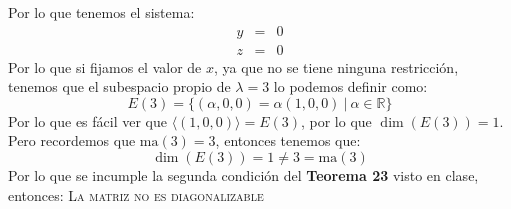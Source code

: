 \begin{itemize}
    Por lo que tenemos el sistema:
    \begin{eqnarray*}
    y&=&0\\
    z&=&0
    \end{eqnarray*}
    Por lo que si fijamos el valor de $x$, ya que no se tiene ninguna restricci\'on, tenemos que el subespacio propio de $\lambda=3$ lo podemos definir como:
    \[E(3)=\{(\alpha,0,0)=\alpha(1,0,0)~|~\alpha\in\mathbb{R}\}\]
    Por lo que es f\'acil ver que $\langle (1,0,0) \rangle=E(3)$, por lo que $\dim(E(3))=1$.\\
    Pero recordemos que $\text{ma}(3)=3$, entonces tenemos que:
    \[\dim(E(3))=1\neq3=\text{ma}(3) \]
    Por lo que se incumple la segunda condici\'on del \textbf{Teorema 23} visto en clase, entonces: \textsc{La matriz no es diagonalizable}
\end{itemize}